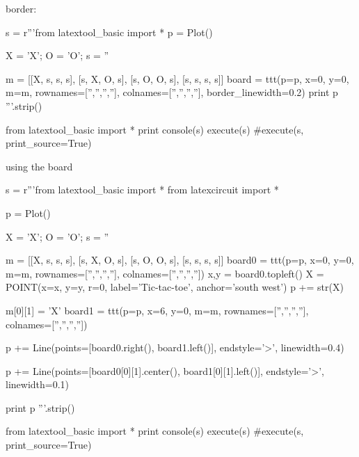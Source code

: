\newpage
border:
\begin{python}
s = r'''from latextool_basic import *
p = Plot()

X = 'X'; O = 'O'; s = ''

m = [[X, s, s, s],
     [s, X, O, s],
     [s, O, O, s],
     [s, s, s, s]]
board = ttt(p=p, x=0, y=0,
            m=m,
            rownames=['','','',''], colnames=['','','',''],
            border_linewidth=0.2)
print p
'''.strip()

from latextool_basic import *
print console(s)
execute(s)
#execute(s, print_source=True)
\end{python}

\newpage
using the board
\begin{python}
s = r'''from latextool_basic import *
from latexcircuit import *

p = Plot()

X = 'X'; O = 'O'; s = ''

m = [[X, s, s, s],
     [s, X, O, s],
     [s, O, O, s],
     [s, s, s, s]]
board0 = ttt(p=p, x=0, y=0,
            m=m,
            rownames=['','','',''], colnames=['','','',''])
x,y = board0.topleft()
X = POINT(x=x, y=y, r=0, label='Tic-tac-toe', anchor='south west')
p += str(X)

m[0][1] = 'X'
board1 = ttt(p=p, x=6, y=0,
             m=m,
             rownames=['','','',''], colnames=['','','',''])

p += Line(points=[board0.right(), board1.left()], endstyle='>', linewidth=0.4)

p += Line(points=[board0[0][1].center(),
                  board1[0][1].left()], endstyle='>', linewidth=0.1)

print p
'''.strip()

from latextool_basic import *
print console(s)
execute(s)
#execute(s, print_source=True)
\end{python}

